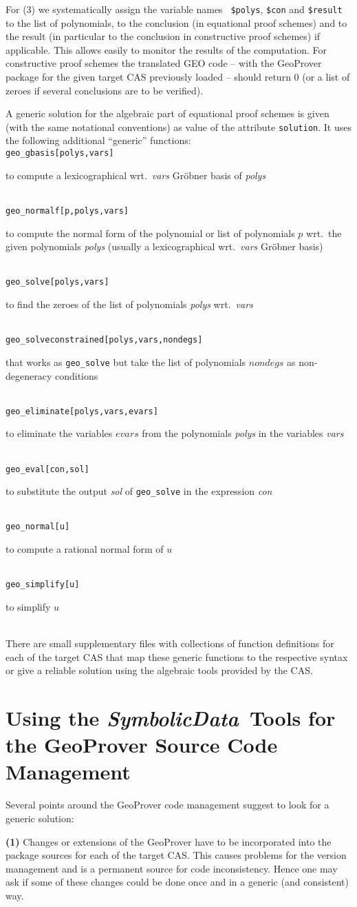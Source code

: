 \documentclass[11pt]{article}
\newcommand{\SD}{{\it Symbo\-lic\-Data}}
\newcommand{\hsp}{\hspace*{1cm}}
\newcommand{\extendedgeocode}[2]
{{\tt #1}\\[1pt]\hsp\parbox{11cm}{#2}\\[6pt]}
\begin{document}
For (3) we systematically assign the variable names {\tt
\$polys}, {\tt \$con} and {\tt \$result} to the list of
polynomials, to the conclusion (in equational proof schemes) and
to the result (in particular to the conclusion in constructive
proof schemes) if applicable.  This allows easily to monitor the
results of the computation. For constructive proof schemes the
translated GEO code -- with the GeoProver package for the given
target CAS previously loaded -- should return 0 (or a list of
zeroes if several conclusions are to be verified).

A generic solution for the algebraic part of equational proof
schemes is given (with the same notational conventions) as value
of the attribute {\tt solution}. It uses the following additional
``generic'' functions: \\[6pt]
\extendedgeocode{geo\_gbasis[polys,vars]}{to compute a
lexicographical wrt.\ {\it vars} Gr\"obner basis of {\it polys} }
\extendedgeocode{geo\_normalf[p,polys,vars]}{to compute the normal
form of the polynomial or list of polynomials $p$ wrt.\ the given
polynomials {\it polys} (usually a lexicographical wrt.\ {\it vars}
Gr\"obner basis) }
\extendedgeocode{geo\_solve[polys,vars]}{to find the zeroes of the
list of polynomials {\it polys} wrt.\ {\it vars}}
\extendedgeocode{geo\_solveconstrained[polys,vars,nondegs]}{that works
as {\tt geo\_solve} but take the list of polynomials $nondegs$ as
non-degeneracy conditions}
\extendedgeocode{geo\_eliminate[polys,vars,evars]}{to eliminate the
variables $evars$ from the polynomials {\it polys} in the variables
{\it vars}} 
\extendedgeocode{geo\_eval[con,sol]}{to substitute the output {\it sol}
of {\tt geo\_solve} in the expression {\it con}}
\extendedgeocode{geo\_normal[u]}{to compute a rational normal form
of $u$}
\extendedgeocode{geo\_simplify[u]}{to simplify $u$}
There are small supplementary files with collections of function
definitions for each of the target CAS that map these generic
functions to the respective syntax or give a reliable solution
using the algebraic tools provided by the CAS.

\section{Using the \SD\ Tools for the GeoProver Source Code
Management} 

Several points around the GeoProver code management suggest to
look for a generic solution:
\medskip

{\bf (1)} Changes or extensions of the GeoProver have to be
incorporated into the package sources for each of the target CAS.
This causes problems for the version management and is a permanent
source for code inconsistency. Hence one may ask if some of these
changes could be done once and in a generic (and consistent)
way.\medskip
\end{document}

